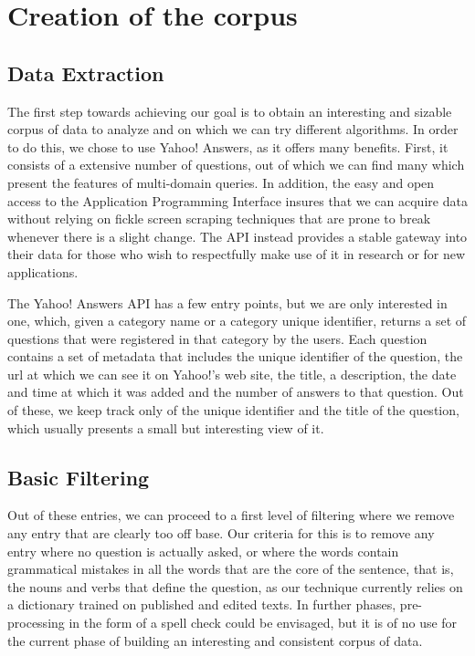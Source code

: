 
\section{Creation of the corpus} %
\label{sec:creation_of_the_corpus}

\subsection{Data Extraction} %
\label{sub:data_extraction}

The first step towards achieving our goal is to obtain an interesting and sizable corpus of data to analyze and on which we can try different algorithms. In order to do this, we chose to use Yahoo! Answers, as it offers many benefits. First, it consists of a extensive number of questions, out of which we can find many which present the features of multi-domain queries. In addition, the easy and open access to the Application Programming Interface insures that we can acquire data without relying on fickle screen scraping techniques that are prone to break whenever there is a slight change. The API instead provides a stable gateway into their data for those who wish to respectfully make use of it in research or for new applications.

The Yahoo! Answers API has a few entry points, but we are only interested in one, which, given a category name or a category unique identifier, returns a set of questions that were registered in that category by the users. Each question contains a set of metadata that includes the unique identifier of the question, the url at which we can see it on Yahoo!'s web site, the title, a description, the date and time at which it was added and the number of answers to that question. Out of these, we keep track only of the unique identifier and the title of the question, which usually presents a small but interesting view of it.


\subsection{Basic Filtering} %
\label{sub:basic_filtering}

Out of these entries, we can proceed to a first level of filtering where we remove any entry that are clearly too off base. Our criteria for this is to remove any entry where no question is actually asked, or where the words contain grammatical mistakes in all the words that are the core of the sentence, that is, the nouns and verbs that define the question, as our technique currently relies on a dictionary trained on published and edited texts. In further phases, pre-processing in the form of a spell check could be envisaged, but it is of no use for the current phase of building an interesting and consistent corpus of data.

